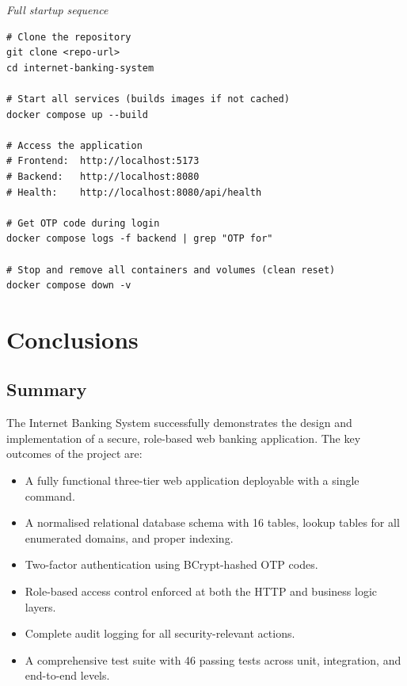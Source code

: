 \documentclass[12pt,a4paper]{report}
\begin{document}
\textit{\small Full startup sequence}\vspace{2pt}
\begin{Verbatim}[frame=single,fontsize=\small,bgcolor=codegray]
# Clone the repository
git clone <repo-url>
cd internet-banking-system

# Start all services (builds images if not cached)
docker compose up --build

# Access the application
# Frontend:  http://localhost:5173
# Backend:   http://localhost:8080
# Health:    http://localhost:8080/api/health

# Get OTP code during login
docker compose logs -f backend | grep "OTP for"

# Stop and remove all containers and volumes (clean reset)
docker compose down -v
\end{Verbatim}


\chapter{Conclusions}
\label{ch:conclusions}

\section{Summary}

The Internet Banking System successfully demonstrates the design and implementation of a
secure, role-based web banking application. The key outcomes of the project are:

\begin{itemize}
  \item A fully functional three-tier web application deployable with a single command.
  \item A normalised relational database schema with 16 tables, lookup tables for all
        enumerated domains, and proper indexing.
  \item Two-factor authentication using BCrypt-hashed OTP codes.
  \item Role-based access control enforced at both the HTTP and business logic layers.
  \item Complete audit logging for all security-relevant actions.
  \item A comprehensive test suite with 46 passing tests across unit, integration,
        and end-to-end levels.
\end{itemize}
\end{document}
